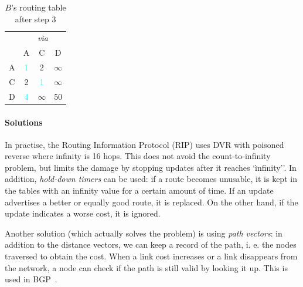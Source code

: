 \documentclass[12pt,a4paper]{article}
\begin{document}
\begin{table}[!ht]
\centering
\begin{tabular}{c|ccc}
	& \multicolumn{3}{c}{\textit{via}} 						\\
	&	A			&	C			&	D					\\
\hline
A	& 	\textcolor{Cyan}{1}	&	2			&	$\infty$	\\
C	&	2			&	\textcolor{Cyan}{1}	&	$\infty$	\\
D	&	\textcolor{Cyan}{4}	&	$\infty$	&	50			\\
\end{tabular}
\caption{$B$'s routing table after step 3}
\label{tab:step3}
\end{table}

\paragraph{Solutions}
In practise, the Routing Information Protocol (RIP) uses DVR with poisoned reverse where infinity is 16 hops. This does not avoid the count-to-infinity problem, but limits the damage by stopping updates after it reaches `ìnfinity''.
In addition, \textit{hold-down timers} can be used: if a route becomes unusable, it is kept in the tables with an infinity value for a certain amount of time. If an update advertises a better or equally good route, it is replaced. On the other hand, if the update indicates a worse cost, it is ignored. 

Another solution (which actually solves the problem) is using \textit{path vectors}: in addition to the distance vectors, we can keep a record of the path, i. e. the nodes traversed to obtain the cost. When a link cost increases or a link disappears from the network, a node can check if the path is still valid by looking it up. This is used in BGP~\cite{mit}.



\nocite{*}
    
\end{document}

